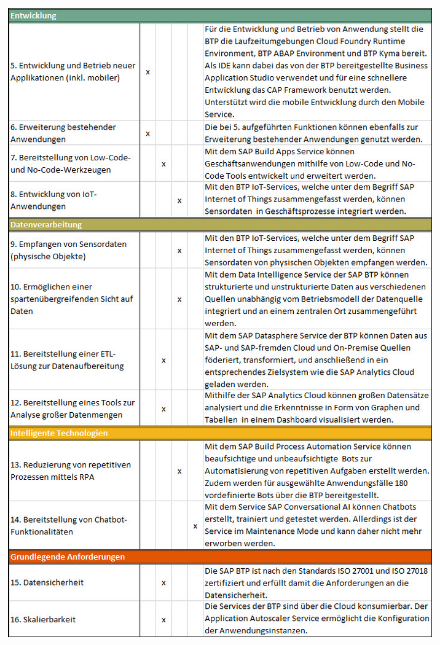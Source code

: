 \begin{figure}[ht]
    \centering
    \includegraphics[width=1\textwidth]{img/TTFTeil1_6_16.jpg}
    \label{fig:TTFTeil2}
\end{figure}

\FloatBarrier

